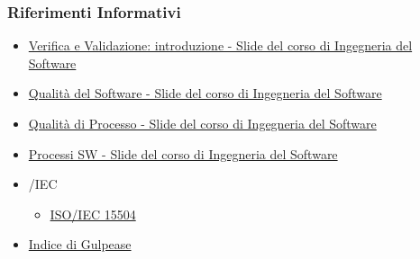 \subsubsection{Riferimenti Informativi}
\begin{itemize}
	\item \href{https://www.math.unipd.it/~tullio/IS-1/2018/Dispense/L16.pdf}{Verifica e Validazione: introduzione - Slide del corso di Ingegneria del Software}
	\item \href{https://www.math.unipd.it/~tullio/IS-1/2018/Dispense/L13.pdf}{Qualità del Software - Slide del corso di Ingegneria del Software}
	\item \href{https://www.math.unipd.it/~tullio/IS-1/2018/Dispense/L14.pdf}{Qualità di Processo - Slide del corso di Ingegneria del Software}
	\item \href{https://www.math.unipd.it/~tullio/IS-1/2018/Dispense/L03.pdf}{Processi SW - Slide del corso di Ingegneria del Software}
	\item {}/IEC
	\begin{itemize} 
		\item \href{http://www.colonese.it/SviluppoSw_Standard_ISO15504.html}{ISO/IEC 15504}
	\end{itemize}
	\item \href{https://it.wikipedia.org/wiki/Indice_Gulpease}{Indice di Gulpease}
\end{itemize}
